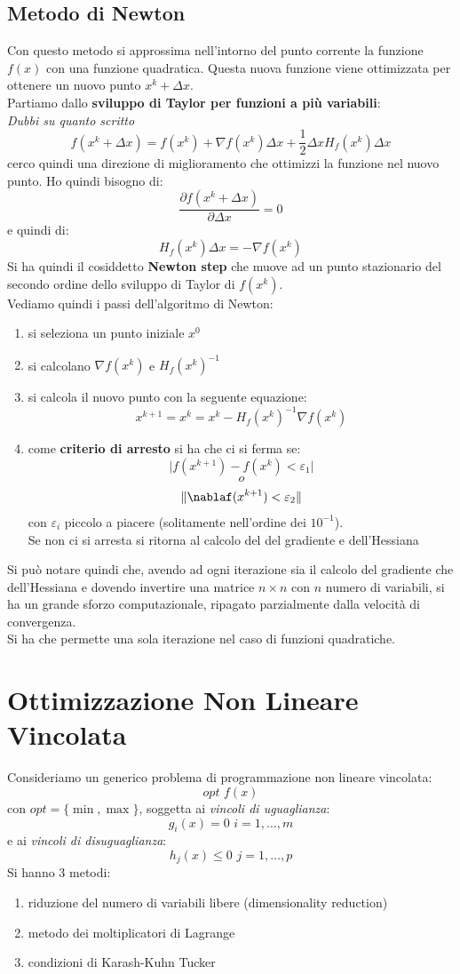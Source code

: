 \message{ !name(ro.tex)}\documentclass[a4paper,12pt, oneside]{book}
\begin{document}
\subsection{Metodo di Newton}
Con questo metodo si approssima nell'intorno del punto corrente la
funzione $f(x)$ con una funzione quadratica. Questa nuova funzione
viene ottimizzata per ottenere un nuovo punto $x^k+\Delta x$.\\
Partiamo dallo \textbf{sviluppo di Taylor per funzioni a più
  variabili}:\\
\textit{Dubbi su quanto scritto}
\[f(x^k+\Delta x)=f(x^k)+\nabla f(x^k)\Delta x+\frac{1}{2}\Delta x
  H_f(x^k)\Delta x\]
cerco quindi una direzione di miglioramento che ottimizzi la funzione
nel nuovo punto. Ho quindi bisogno di:
\[\frac{\partial f(x^k+\Delta x)}{\partial \Delta x}=0\]
e quindi di:
\[H_f(x^k)\Delta x=-\nabla f(x^k)\]
Si ha quindi il cosiddetto \textbf{Newton step} che muove ad un punto
stazionario del secondo ordine dello sviluppo di Taylor di $f(x^k)$.\\
Vediamo quindi i passi dell'algoritmo di Newton:
\begin{enumerate}
  \item si seleziona un punto iniziale $x^0$
  \item si calcolano $\nabla f(x^k)$ e $H_f(x^k)^{-1}$
  \item si calcola il nuovo punto con la seguente equazione:
  \[x^{k+1}=x^k=x^k-H_f(x^k)^{-1}\nabla f(x^k)\]
  \item come \textbf{criterio di arresto} si ha che ci si ferma se:
  \[\vert f(x^{k+1})-f(x^k)<\varepsilon_1 \vert\]
  \[o\]
  \[\Vert \nablaf(x^{k+1})<\varepsilon_2 \Vert\]
  con $\varepsilon_i$ piccolo a piacere (solitamente nell'ordine dei
  $10^{-1}$).\\ 
  Se non ci si arresta si ritorna al calcolo del del gradiente e dell'Hessiana
\end{enumerate}
Si può notare quindi che, avendo ad ogni iterazione sia il calcolo del
gradiente che dell'Hessiana e dovendo invertire una matrice $n\times
n$ con $n$ numero di variabili, si ha un grande sforzo computazionale,
ripagato parzialmente dalla velocità di convergenza.\\
Si ha che permette una sola iterazione nel caso di funzioni
quadratiche.
\section{Ottimizzazione Non Lineare Vincolata}
Consideriamo un generico problema di programmazione non lineare
vincolata:
\[opt\,\,f(x)\]
con $opt=\{\min,\max\}$, soggetta ai \textit{vincoli di uguaglianza}:
\[g_i(x)=0\,\,i=1,\ldots, m\]
e ai \textit{vincoli di disuguaglianza}:
\[h_j(x)\leq0\,\,j=1,\ldots, p\]
Si hanno 3 metodi:
\begin{enumerate}
  \item riduzione del numero di variabili libere (dimensionality
  reduction)
  \item metodo dei moltiplicatori di Lagrange
  \item condizioni di Karash-Kuhn Tucker
\end{enumerate}
\end{document}
